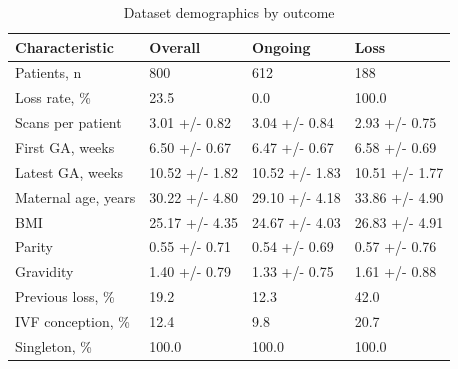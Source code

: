 \begin{table}[ht]
\centering
\caption{Dataset demographics by outcome}
\label{tab:dataset-demographics}
\begin{tabular}{llll}
\hline
Characteristic & Overall & Ongoing & Loss \\
\hline
Patients, n & 800 & 612 & 188 \\
Loss rate, \% & 23.5 & 0.0 & 100.0 \\
Scans per patient & 3.01 +/- 0.82 & 3.04 +/- 0.84 & 2.93 +/- 0.75 \\
First GA, weeks & 6.50 +/- 0.67 & 6.47 +/- 0.67 & 6.58 +/- 0.69 \\
Latest GA, weeks & 10.52 +/- 1.82 & 10.52 +/- 1.83 & 10.51 +/- 1.77 \\
Maternal age, years & 30.22 +/- 4.80 & 29.10 +/- 4.18 & 33.86 +/- 4.90 \\
BMI & 25.17 +/- 4.35 & 24.67 +/- 4.03 & 26.83 +/- 4.91 \\
Parity & 0.55 +/- 0.71 & 0.54 +/- 0.69 & 0.57 +/- 0.76 \\
Gravidity & 1.40 +/- 0.79 & 1.33 +/- 0.75 & 1.61 +/- 0.88 \\
Previous loss, \% & 19.2 & 12.3 & 42.0 \\
IVF conception, \% & 12.4 & 9.8 & 20.7 \\
Singleton, \% & 100.0 & 100.0 & 100.0 \\
\hline
\end{tabular}
\end{table}
